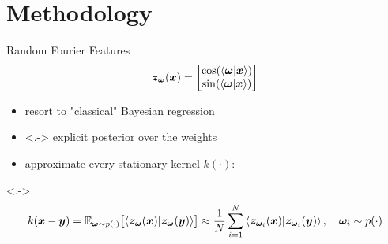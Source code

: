 \documentclass[
	USenglish,
	aspectratio=43,
	color={accentcolor=1c},
	logo=true,
	colorframetitle=true,
	hyperref={pdfpagelabels=true},
]{tudabeamer}
\begin{document}
	\section{Methodology}
		\begin{frame}{Random Fourier Features}
			\begin{equation}
				\vec{z}_{\vec{\omega}}(\vec{x}) =
					\begin{bmatrix}
						\cos(\ip{\vec{\omega}}{\vec{x}}) \\
						\sin(\ip{\vec{\omega}}{\vec{x}})
					\end{bmatrix}
			\end{equation}
			\begin{itemize}
				\item<+-> resort to "classical" Bayesian regression
				\item<.-> explicit posterior over the weights
				\item<+-> approximate every stationary kernel \( k(\cdot) \):
			\end{itemize}
			\onslide<.->{
				\begin{gather}
					k(\vec{x} - \vec{y})
						= \E_{\vec{\omega} \sim p(\cdot)}\bigl[ \ip{\vec{z}_{\vec{\omega}}(\vec{x})}{\vec{z}_{\vec{\omega}}(\vec{y})} \bigr]
						\approx \frac{1}{N} \sum_{i = 1}^{N} \ip{\vec{z}_{\vec{\omega}_i}(\vec{x})}{\vec{z}_{\vec{\omega}_i}(\vec{y})},\quad
						\vec{\omega}_i \sim p(\cdot)
				\end{gather}
			}
		\end{frame}
\end{document}
